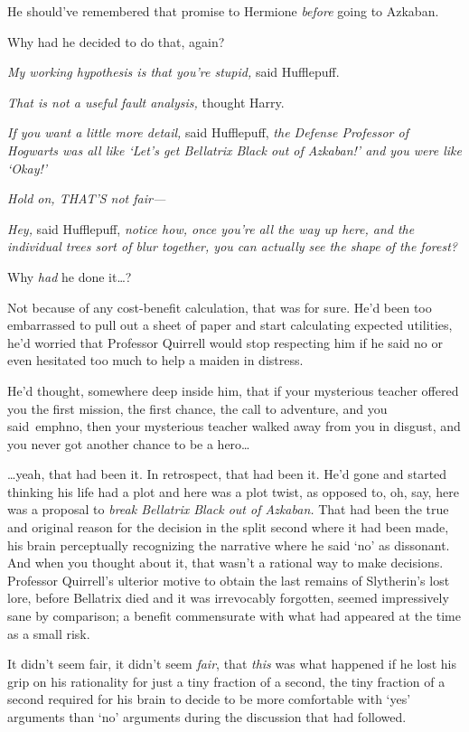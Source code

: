 He should've remembered that promise to Hermione \emph{before} going to Azkaban.

Why had he decided to do that, again?

\emph{My working hypothesis is that you're stupid,} said Hufflepuff.

\emph{That is not a useful fault analysis,} thought Harry.

\emph{If you want a little more detail,} said Hufflepuff, \emph{the Defense 
Professor of Hogwarts was all like `Let's get Bellatrix Black out of Azkaban!' 
and you were like `Okay!'}

\emph{Hold on, THAT'S not fair---}

\emph{Hey,} said Hufflepuff, \emph{notice how, once you're all the way up here, 
and the individual trees sort of blur together, you can actually see the shape 
of the forest?}

Why \emph{had} he done it{\ldots}?

Not because of any cost-benefit calculation, that was for sure. He'd been too 
embarrassed to pull out a sheet of paper and start calculating expected 
utilities, he'd worried that Professor Quirrell would stop respecting him if he 
said no or even hesitated too much to help a maiden in distress.

He'd thought, somewhere deep inside him, that if your mysterious teacher 
offered you the first mission, the first chance, the call to adventure, and you 
said\ emph{no}, then your mysterious teacher walked away from you in disgust, 
and you never got another chance to be a hero{\ldots}

{\ldots}yeah, that had been it. In retrospect, that had been it. He'd gone and 
started thinking his life had a plot and here was a plot twist, as opposed to, 
oh, say, here was a proposal to \emph{break Bellatrix Black out of Azkaban.} 
That had been the true and original reason for the decision in the split second 
where it had been made, his brain perceptually recognizing the narrative where 
he said `no' as dissonant. And when you thought about it, that wasn't a 
rational way to make decisions. Professor Quirrell's ulterior motive to obtain 
the last remains of Slytherin's lost lore, before Bellatrix died and it was 
irrevocably forgotten, seemed impressively sane by comparison; a benefit 
commensurate with what had appeared at the time as a small risk.

It didn't seem fair, it didn't seem \emph{fair}, that \emph{this} was what 
happened if he lost his grip on his rationality for just a tiny fraction of a 
second, the tiny fraction of a second required for his brain to decide to be 
more comfortable with `yes' arguments than `no' arguments during the discussion 
that had followed.

